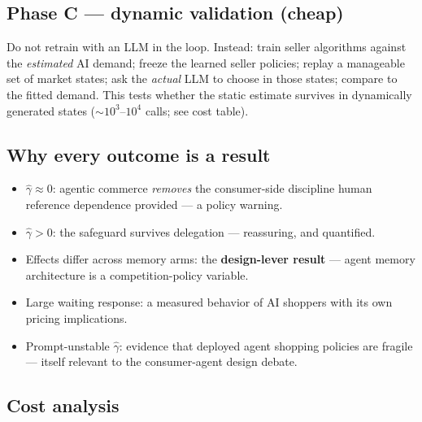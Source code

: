 \documentclass[11pt]{article}
\begin{document}
\subsection*{Phase C --- dynamic validation (cheap)}

Do not retrain with an LLM in the loop. Instead: train seller algorithms against the \emph{estimated} AI
demand; freeze the learned seller policies; replay a manageable set of market states; ask the \emph{actual}
LLM to choose in those states; compare to the fitted demand. This tests whether the static estimate
survives in dynamically generated states ($\sim$$10^3$--$10^4$ calls; see cost table).

\subsection*{Why every outcome is a result}

\begin{itemize}\setlength\itemsep{1pt}
  \item $\hat\gamma\approx0$: agentic commerce \emph{removes} the consumer-side discipline human reference
        dependence provided --- a policy warning.
  \item $\hat\gamma>0$: the safeguard survives delegation --- reassuring, and quantified.
  \item Effects differ across memory arms: the \textbf{design-lever result} --- agent memory architecture
        is a competition-policy variable.
  \item Large waiting response: a measured behavior of AI shoppers with its own pricing implications.
  \item Prompt-unstable $\hat\gamma$: evidence that deployed agent shopping policies are fragile ---
        itself relevant to the consumer-agent design debate.
\end{itemize}

\subsection*{Cost analysis}
\end{document}
